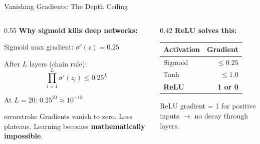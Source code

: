 \documentclass[aspectratio=169, 12pt]{beamer}
\begin{document}
\begin{frame}{Vanishing Gradients: The Depth Ceiling}

\small
\begin{columns}[T]
  \begin{column}{0.55\textwidth}
    \textbf{Why sigmoid kills deep networks:}

    \vspace{0.15cm}
    Sigmoid max gradient: $\sigma'(z) = 0.25$

    \vspace{0.1cm}
    After $L$ layers (chain rule):
    $$\prod_{l=1}^{L} \sigma'(z_l) \leq 0.25^L$$

    \vspace{0.1cm}
    At $L = 20$: $0.25^{20} \approx 10^{-12}$

    \vspace{0.15cm}
    \begin{mlsyscard}{errorstroke}
    {\footnotesize Gradients vanish to zero. Loss plateaus. Learning becomes \textbf{mathematically impossible}.}
    \end{mlsyscard}
  \end{column}
  \begin{column}{0.42\textwidth}
    \vspace{0.2cm}
    \textbf{ReLU solves this:}

    \vspace{0.1cm}
    {\footnotesize
    \renewcommand{\arraystretch}{1.15}
    \begin{tabular}{@{}lr@{}}
      \toprule
      \textbf{Activation} & \textbf{Gradient} \\
      \midrule
      Sigmoid & $\leq 0.25$ \\
      Tanh    & $\leq 1.0$ \\
      \textcolor{datastroke}{\textbf{ReLU}} & \textcolor{datastroke}{\textbf{1 or 0}} \\
      \bottomrule
    \end{tabular}
    }

    \vspace{0.15cm}
    {\footnotesize ReLU gradient = 1 for positive inputs $\to$ no decay through layers.}
  \end{column}
\end{columns}

\end{frame}
\end{document}
